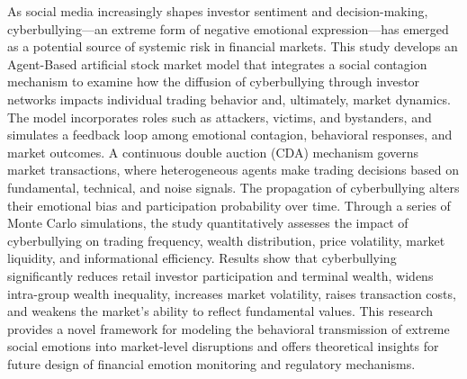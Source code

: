 \documentclass[
    type = bachelor, %
    oneside,                %
  ]{njuthesis}
\begin{document}
\begin{abstract*}
As social media increasingly shapes investor sentiment and decision-making, cyberbullying—an extreme form of negative emotional expression—has emerged as a potential source of systemic risk in financial markets. This study develops an Agent-Based artificial stock market model that integrates a social contagion mechanism to examine how the diffusion of cyberbullying through investor networks impacts individual trading behavior and, ultimately, market dynamics.
The model incorporates roles such as attackers, victims, and bystanders, and simulates a feedback loop among emotional contagion, behavioral responses, and market outcomes. A continuous double auction (CDA) mechanism governs market transactions, where heterogeneous agents make trading decisions based on fundamental, technical, and noise signals. The propagation of cyberbullying alters their emotional bias and participation probability over time.
Through a series of Monte Carlo simulations, the study quantitatively assesses the impact of cyberbullying on trading frequency, wealth distribution, price volatility, market liquidity, and informational efficiency. Results show that cyberbullying significantly reduces retail investor participation and terminal wealth, widens intra-group wealth inequality, increases market volatility, raises transaction costs, and weakens the market's ability to reflect fundamental values.
This research provides a novel framework for modeling the behavioral transmission of extreme social emotions into market-level disruptions and offers theoretical insights for future design of financial emotion monitoring and regulatory mechanisms.

\end{abstract*}

\tableofcontents
\listoffigures
\listoftables

\mainmatter

\end{document}
